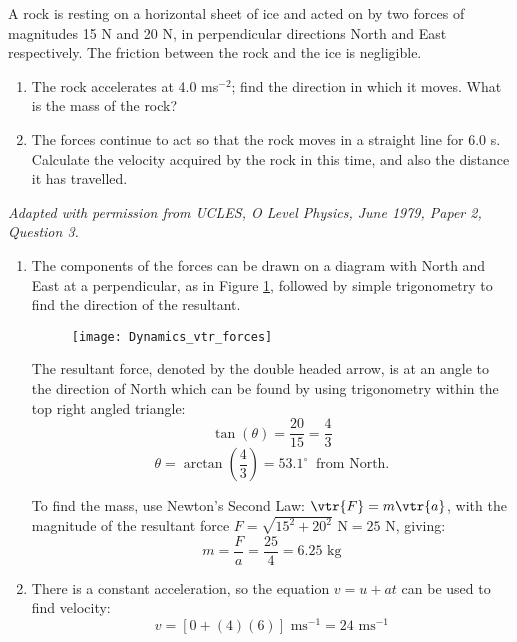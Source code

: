 \begin{problem}[O1979PIIQ3a]
{A rock is resting on a horizontal sheet of ice and acted on by two forces of magnitudes 15 N and 20 N, in perpendicular directions North and East respectively. The friction between the rock and the ice is negligible.
\begin{enumerate}
	\item The rock accelerates at 4.0 ms$^{-2}$; find the direction in which it moves. What is the mass of the rock?
	\item The forces continue to act so that the rock moves in a straight line for 6.0 s. Calculate the velocity acquired by the rock in this time, and also the distance it has travelled.
\end{enumerate}
}
{\textit{Adapted with permission from UCLES, O Level Physics, June 1979, Paper 2, Question 3.}}
{\begin{enumerate}
	\item The components of the forces can be drawn on a diagram with North and East at a perpendicular, as in Figure \ref{fig:Dynamics_vtr_forces}, followed by simple trigonometry to find the direction of the resultant. 
\begin{figure}[h]
	\centering
	\texttt{[image: Dynamics\_vtr\_forces]}
	\caption{}
	\label{fig:Dynamics_vtr_forces}
\end{figure}

The resultant force, denoted by the double headed arrow, is at an angle to the direction of North which can be found by using trigonometry within the top right angled triangle:
	\begin{equation*}\tan(\theta)=\frac{20}{15} = \frac{4}{3} \end{equation*}
	\begin{equation*}\theta = \arctan\left(\frac{4}{3}\right) = 53.1^{\circ} \:\textrm{ from North.}\end{equation*}

To find the mass, use Newton's Second Law: $\vtr{F} = m\vtr{a}$, with the magnitude of the resultant force $F = \sqrt{15^{2} + 20^{2}} \textrm{ N} = 25 \textrm{ N}$, giving: 
\begin{equation*}m = \frac{F}{a} = \frac{25}{4} = 6.25 \textrm{ kg} \end{equation*}
	\item There is a constant acceleration, so the equation $v = u + at$ can be used to find velocity: 
	\begin{equation*} v = [0 + (4)(6)] \textrm{ ms}^{-1} = 24 \textrm{ ms}^{-1} \end{equation*}


\end{enumerate}}
\end{problem}
